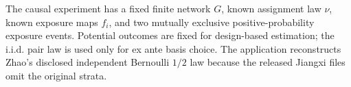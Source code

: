 The causal experiment has a fixed finite network \(G\), known assignment law \(\nu\), known exposure maps \(f_i\), and two mutually exclusive positive-probability exposure events.  Potential outcomes are fixed for design-based estimation; the i.i.d. pair law is used only for ex ante basis choice.  The application reconstructs Zhao's disclosed independent Bernoulli \(1/2\) law because the released Jiangxi files omit the original strata.